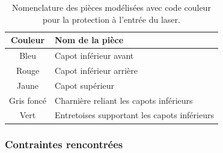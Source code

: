 \begin{table}[H]
    \centering
    \begin{tabular}{|c|l|}
        \hline
        \textbf{Couleur}                           & \textbf{Nom de la pièce}                     \\
        \hline
        \textcolor[RGB]{88, 122, 163}{Bleu}        & Capot inférieur avant                        \\
        \textcolor[RGB]{170, 80, 70}{Rouge}        & Capot inférieur arrière                      \\
        \textcolor[RGB]{233, 173, 56}{Jaune}       & Capot supérieur                              \\
        \textcolor[RGB]{100, 100, 100}{Gris foncé} & Charnière reliant les capots inférieurs      \\
        \textcolor[RGB]{70, 170, 70}{Vert}         & Entretoises supportant les capots inférieurs \\
        \hline
    \end{tabular}
    \caption{Nomenclature des pièces modélisées avec code couleur pour la protection à l'entrée du laser. \cite{chatgptTableProtectionEntreeLaser}}
    \label{tab:nomenclature_pieces_laser}
\end{table}

\subsubsection{Contraintes rencontrées}

